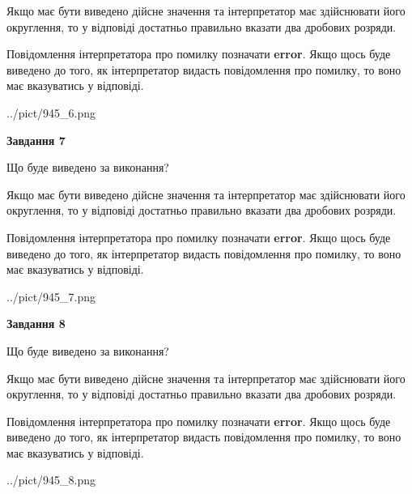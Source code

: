 \documentclass[12pt, ukrainian]{article}
\begin{document}
{\begin {Large}
Якщо має бути виведено дійсне значення та інтерпретатор має здійснювати його округлення, 
то у відповіді достатньо правильно вказати два дробових розряди.

Повідомлення інтерпретатора про помилку позначати \textbf{error}.
Якщо щось буде виведено до того, як інтерпретатор видасть повідомлення про помилку, 
то воно має вказуватись у відповіді. \par

\begin{center}
	{../pict/945_6.png}
\end{center}
\newpage

{\begin {center}\textbf{Завдання 7}\end {center}}\par
Що буде виведено за виконання? \par

Якщо має бути виведено дійсне значення та інтерпретатор має здійснювати його округлення, 
то у відповіді достатньо правильно вказати два дробових розряди.

Повідомлення інтерпретатора про помилку позначати \textbf{error}.
Якщо щось буде виведено до того, як інтерпретатор видасть повідомлення про помилку, 
то воно має вказуватись у відповіді. \par

\begin{center}
	{../pict/945_7.png}
\end{center}
\newpage

{\begin {center}\textbf{Завдання 8}\end {center}}\par
Що буде виведено за виконання? \par

Якщо має бути виведено дійсне значення та інтерпретатор має здійснювати його округлення, 
то у відповіді достатньо правильно вказати два дробових розряди.

Повідомлення інтерпретатора про помилку позначати \textbf{error}.
Якщо щось буде виведено до того, як інтерпретатор видасть повідомлення про помилку, 
то воно має вказуватись у відповіді. \par

\begin{center}
	{../pict/945_8.png}
\end{center}
\newpage


\end{Large}}
\end{document}
